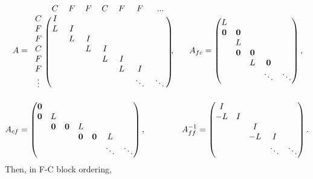 \documentclass[a4paper,12pt]{article}
\begin{document}
%
\begin{align*}
A & = \begin{blockarray}{cccccccc}
& C & F & F & C & F & F & ... \\
\begin{block}{c(ccccccc)}
C &  I & & & & & \\
F &  L & I & & & & \\
F &  & L & I & & & \\
C &  & & L & I & & \\
F &  & & & L & I &  \\
F &  &  & & & L & I  \\ 
\vdots  & & &  & & & \ddots & \ddots \\
\end{block}
\end{blockarray}, 
\hspace{4ex}
A_{fc} = \begin{pmatrix} L \\ \mathbf{0} & \mathbf{0}  \\ & L \\ & \mathbf{0} & \mathbf{0} \\ & & L & \mathbf{0} \\ &&&\ddots&\ddots \end{pmatrix}, 
\\
A_{cf} & = \begin{pmatrix} \mathbf{0} \\ \mathbf{0} & L \\ & \mathbf{0} & \mathbf{0} & L \\ &&& \mathbf{0} & \mathbf{0} & L \\ &&&&&\ddots&\ddots \end{pmatrix}, 
\hspace{10ex}
A_{ff}^{-1} = \begin{pmatrix} I \\ -L & I \\ & & I \\ & & -L & I \\ & & & \ddots & \ddots \end{pmatrix}.
\end{align*}
%
Then, in F-C block ordering, 
%
\end{document}
